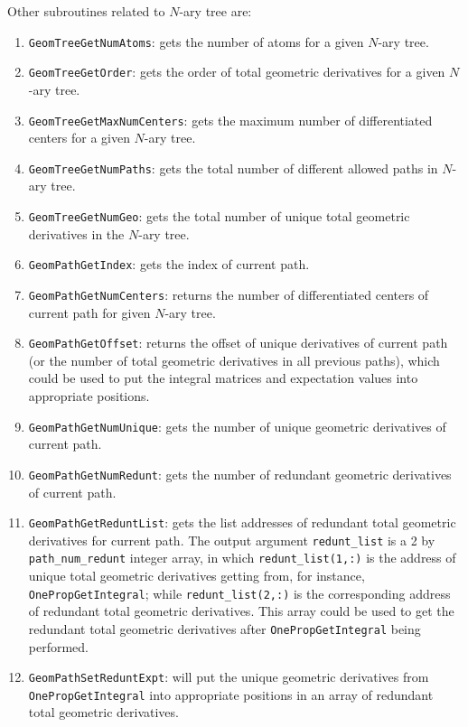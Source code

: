 \documentclass[a4paper,11pt,twoside,openright]{book}
\begin{document}
Other subroutines related to $N$-ary tree are:
\begin{enumerate}
  \item \verb|GeomTreeGetNumAtoms|:
    gets the number of atoms for a given $N$-ary tree.
  \item \verb|GeomTreeGetOrder|:
    gets the order of total geometric derivatives for a given $N$-ary tree.
  \item \verb|GeomTreeGetMaxNumCenters|:
    gets the maximum number of differentiated centers for a given $N$-ary tree.
  \item \verb|GeomTreeGetNumPaths|:
    gets the total number of different allowed paths in $N$-ary tree.
  \item \verb|GeomTreeGetNumGeo|:
    gets the total number of unique total geometric derivatives in the $N$-ary tree.
  \item \verb|GeomPathGetIndex|:
    gets the index of current path.
  \item \verb|GeomPathGetNumCenters|:
    returns the number of differentiated centers of current path for given $N$-ary tree.
  \item \verb|GeomPathGetOffset|:
    returns the offset of unique derivatives of current path (or the number of total geometric
    derivatives in all previous paths), which could be used to put the integral matrices and
    expectation values into appropriate positions.
  \item \verb|GeomPathGetNumUnique|:
    gets the number of unique geometric derivatives of current path.
  \item \verb|GeomPathGetNumRedunt|:
    gets the number of redundant geometric derivatives of current path.
  \item \verb|GeomPathGetReduntList|:
    gets the list addresses of redundant total geometric derivatives for current path. The output argument
    \verb|redunt_list| is a 2 by \verb|path_num_redunt| integer array, in which \verb|redunt_list(1,:)| is the
    address of unique total geometric derivatives getting from, for instance, \verb|OnePropGetIntegral|;
    while \verb|redunt_list(2,:)| is the corresponding address of redundant total geometric derivatives.
    This array could be used to get the redundant total geometric derivatives after \verb|OnePropGetIntegral|
    being performed.
  \item \verb|GeomPathSetReduntExpt|:
    will put the unique geometric derivatives from \verb|OnePropGetIntegral|
    into appropriate positions in an array of redundant total geometric derivatives.
\end{enumerate}
\end{document}
